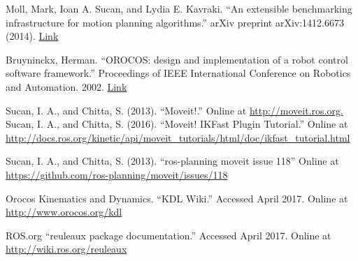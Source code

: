 \documentclass[12pt]{report}
\begin{document}
\begin{thebibliography}{99}
 Moll, Mark, Ioan A. Sucan, and Lydia E. Kavraki. ``An extensible benchmarking infrastructure for motion planning algorithms.'' arXiv preprint arXiv:1412.6673 (2014). \href{https://arxiv.org/pdf/1412.6673.pdf}{Link}

 Bruyninckx, Herman. ``OROCOS: design and implementation of a robot control software framework.'' Proceedings of IEEE International Conference on Robotics and Automation. 2002. \href{http://citeseerx.ist.psu.edu/viewdoc/download?doi=10.1.1.415.9503&rep=rep1&type=pdf}{Link}

 Sucan, I. A., and Chitta, S. (2013). ``Moveit!.'' Online at \url{http://moveit.ros.org.}
 Sucan, I. A., and Chitta, S. (2016). ``Moveit! IKFast Plugin Tutorial.'' Online at \url{http://docs.ros.org/kinetic/api/moveit_tutorials/html/doc/ikfast_tutorial.html}

 Sucan, I. A., and Chitta, S. (2013). ``ros-planning moveit issue 118'' Online at \url{https://github.com/ros-planning/moveit/issues/118}

 Orocos Kinematics and Dynamics. ``KDL Wiki.'' Accessed April 2017. Online at \url{http://www.orocos.org/kdl}

 ROS.org ``reuleaux package documentation.'' Accessed April 2017. Online at \url{http://wiki.ros.org/reuleaux}

\end{thebibliography}

% 
% 

%

%
\end{document}
